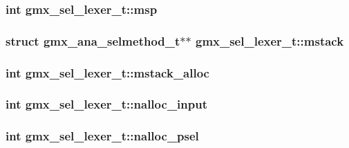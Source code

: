\hypertarget{structgmx__sel__lexer__t_aa043cc5fb256982c5cdaf2f73b23c45f}{
\subsubsection[{msp}]{\setlength{\rightskip}{0pt plus 5cm}int {\bf gmx\-\_\-sel\-\_\-lexer\-\_\-t\-::msp}}}\label{structgmx__sel__lexer__t_aa043cc5fb256982c5cdaf2f73b23c45f}
\hypertarget{structgmx__sel__lexer__t_a3e71cb042172f69ab46c052232e40366}{
\subsubsection[{mstack}]{\setlength{\rightskip}{0pt plus 5cm}struct {\bf gmx\-\_\-ana\-\_\-selmethod\-\_\-t}$\ast$$\ast$ {\bf gmx\-\_\-sel\-\_\-lexer\-\_\-t\-::mstack}}}\label{structgmx__sel__lexer__t_a3e71cb042172f69ab46c052232e40366}
\hypertarget{structgmx__sel__lexer__t_afaa0845d2a641ae5ef0cce5fb34cd8a2}{
\subsubsection[{mstack\-\_\-alloc}]{\setlength{\rightskip}{0pt plus 5cm}int {\bf gmx\-\_\-sel\-\_\-lexer\-\_\-t\-::mstack\-\_\-alloc}}}\label{structgmx__sel__lexer__t_afaa0845d2a641ae5ef0cce5fb34cd8a2}
\hypertarget{structgmx__sel__lexer__t_a9cddfb4c17c03f825cc4ca28befbb02b}{
\subsubsection[{nalloc\-\_\-input}]{\setlength{\rightskip}{0pt plus 5cm}int {\bf gmx\-\_\-sel\-\_\-lexer\-\_\-t\-::nalloc\-\_\-input}}}\label{structgmx__sel__lexer__t_a9cddfb4c17c03f825cc4ca28befbb02b}
\hypertarget{structgmx__sel__lexer__t_a406c46c4363efbb6334142facff6091e}{
\subsubsection[{nalloc\-\_\-psel}]{\setlength{\rightskip}{0pt plus 5cm}int {\bf gmx\-\_\-sel\-\_\-lexer\-\_\-t\-::nalloc\-\_\-psel}}}\label{structgmx__sel__lexer__t_a406c46c4363efbb6334142facff6091e}
